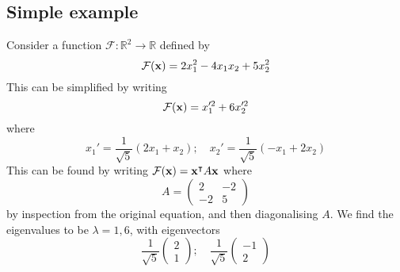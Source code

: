 \subsection{Simple example}
Consider a function \(\mathcal F\colon \mathbb R^2 \to \mathbb R\) defined by
\[
	\mathcal F(\vb x) = 2x_1^2 - 4x_1x_2 + 5x_2^2
\]
This can be simplified by writing
\[
	\mathcal F(\vb x) = x_1'^2 + 6x_2'^2
\]
where
\[
	x_1' = \frac{1}{\sqrt 5}(2x_1 + x_2);\quad x_2' = \frac{1}{\sqrt 5}(-x_1 + 2x_2)
\]
This can be found by writing \(\mathcal F(\vb x) = \vb x^\intercal A\vb x\) where
\[
	A = \begin{pmatrix}
		2 & -2 \\ -2 & 5
	\end{pmatrix}
\]
by inspection from the original equation, and then diagonalising \(A\).
We find the eigenvalues to be \(\lambda = 1, 6\), with eigenvectors
\[
	\frac{1}{\sqrt 5} \begin{pmatrix}
		2 \\ 1
	\end{pmatrix};\quad \frac{1}{\sqrt 5}\begin{pmatrix}
		-1 \\ 2
	\end{pmatrix}
\]

